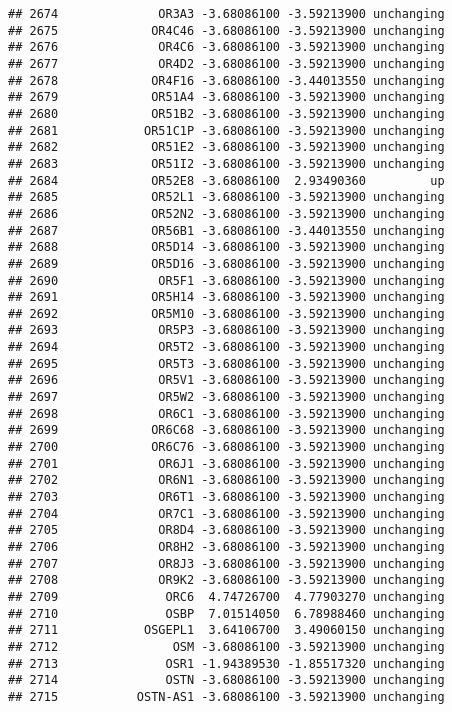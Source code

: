 \documentclass[]{article}
\begin{document}
\begin{verbatim}
## 2674              OR3A3 -3.68086100 -3.59213900 unchanging
## 2675             OR4C46 -3.68086100 -3.59213900 unchanging
## 2676              OR4C6 -3.68086100 -3.59213900 unchanging
## 2677              OR4D2 -3.68086100 -3.59213900 unchanging
## 2678             OR4F16 -3.68086100 -3.44013550 unchanging
## 2679             OR51A4 -3.68086100 -3.59213900 unchanging
## 2680             OR51B2 -3.68086100 -3.59213900 unchanging
## 2681            OR51C1P -3.68086100 -3.59213900 unchanging
## 2682             OR51E2 -3.68086100 -3.59213900 unchanging
## 2683             OR51I2 -3.68086100 -3.59213900 unchanging
## 2684             OR52E8 -3.68086100  2.93490360         up
## 2685             OR52L1 -3.68086100 -3.59213900 unchanging
## 2686             OR52N2 -3.68086100 -3.59213900 unchanging
## 2687             OR56B1 -3.68086100 -3.44013550 unchanging
## 2688             OR5D14 -3.68086100 -3.59213900 unchanging
## 2689             OR5D16 -3.68086100 -3.59213900 unchanging
## 2690              OR5F1 -3.68086100 -3.59213900 unchanging
## 2691             OR5H14 -3.68086100 -3.59213900 unchanging
## 2692             OR5M10 -3.68086100 -3.59213900 unchanging
## 2693              OR5P3 -3.68086100 -3.59213900 unchanging
## 2694              OR5T2 -3.68086100 -3.59213900 unchanging
## 2695              OR5T3 -3.68086100 -3.59213900 unchanging
## 2696              OR5V1 -3.68086100 -3.59213900 unchanging
## 2697              OR5W2 -3.68086100 -3.59213900 unchanging
## 2698              OR6C1 -3.68086100 -3.59213900 unchanging
## 2699             OR6C68 -3.68086100 -3.59213900 unchanging
## 2700             OR6C76 -3.68086100 -3.59213900 unchanging
## 2701              OR6J1 -3.68086100 -3.59213900 unchanging
## 2702              OR6N1 -3.68086100 -3.59213900 unchanging
## 2703              OR6T1 -3.68086100 -3.59213900 unchanging
## 2704              OR7C1 -3.68086100 -3.59213900 unchanging
## 2705              OR8D4 -3.68086100 -3.59213900 unchanging
## 2706              OR8H2 -3.68086100 -3.59213900 unchanging
## 2707              OR8J3 -3.68086100 -3.59213900 unchanging
## 2708              OR9K2 -3.68086100 -3.59213900 unchanging
## 2709               ORC6  4.74726700  4.77903270 unchanging
## 2710               OSBP  7.01514050  6.78988460 unchanging
## 2711            OSGEPL1  3.64106700  3.49060150 unchanging
## 2712                OSM -3.68086100 -3.59213900 unchanging
## 2713               OSR1 -1.94389530 -1.85517320 unchanging
## 2714               OSTN -3.68086100 -3.59213900 unchanging
## 2715           OSTN-AS1 -3.68086100 -3.59213900 unchanging

\end{verbatim}
\end{document}
